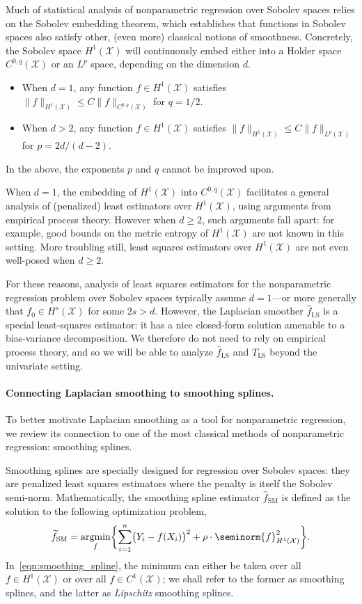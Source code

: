 \documentclass{article}
\newcommand{\1}{\mathbf{1}}
\DeclareMathOperator*{\argmin}{argmin}
\newcommand{\Xset}{\mathcal{X}}
\newcommand{\Leb}{L}
\newcommand{\wt}[1]{\widetilde{#1}}
\newcommand{\wh}[1]{\widehat{#1}}
\newcommand{\LS}{\mathrm{LS}}
\newcommand{\SM}{\mathrm{SM}}
\theoremstyle{alden}
\theoremstyle{aldenthm}
\theoremstyle{definition}
\theoremstyle{remark}
\begin{document}
Much of statistical analysis of nonparametric regression over Sobolev spaces relies on the Sobolev embedding theorem, which establishes that functions in Sobolev spaces also satisfy other, (even more) classical notions of smoothness. Concretely, the Sobolev space $H^1(\Xset)$ will continuously embed either into a Holder space $C^{0,q}(\Xset)$ or an $\Leb^p$ space, depending on the dimension $d$.
\begin{itemize}
	\item When $d = 1$, any function $f \in H^1(\Xset)$ satisfies $\|f\|_{H^1(\Xset)} \leq C\|f\|_{C^{0,q}(\Xset)}$ for $q = 1/2.$
	\item When $d > 2$, any function $f \in H^1(\Xset)$ satisfies $\|f\|_{H^1(\Xset)} \leq C\|f\|_{\Leb^{p}(\Xset)}$ for $p = 2d/(d - 2)$. 
\end{itemize}
In the above, the exponents $p$ and $q$ cannot be improved upon. 

When $d = 1$, the embedding of $H^1(\Xset)$ into $C^{0,q}(\Xset)$ facilitates a general analysis of (penalized) least estimators over $H^1(\Xset)$, using arguments from empirical process theory. However when $d \geq 2$, such arguments fall apart: for example, good bounds on the metric entropy of $H^1(\Xset)$ are not known in this setting. More troubling still, least squares estimators over $H^1(\Xset)$ are not even well-posed when $d \geq 2$.

For these reasons, analysis of least squares estimators for the nonparametric regression problem over Sobolev spaces typically assume $d = 1$---or more generally that $f_0 \in H^s(\Xset)$ for some $2s > d$. However, the Laplacian smoother $\wh{f}_{\LS}$ is a special least-squares estimator: it has a nice closed-form solution amenable to a bias-variance decomposition. We therefore do not need to rely on empirical process theory, and so we will be able to analyze $\wh{f}_{\LS}$ and $T_{\LS}$ beyond the univariate setting.

\paragraph{Connecting Laplacian smoothing to smoothing splines.} 
To better motivate Laplacian smoothing as a tool for nonparametric regression, we review its connection to one of the most classical methods of nonparametric regression: smoothing splines.

Smoothing splines are specially designed for regression over Sobolev spaces: they are penalized least squares estimators where the penalty is itself the Sobolev semi-norm. Mathematically, the smoothing spline estimator $\wh{f}_{\SM}$ is defined as the solution to the following optimization problem,
\begin{equation}
\label{eqn:smoothing_spline}
\wt{f}_{\SM} = \argmin_{f} \biggl\{\sum_{i = 1}^{n} \bigl(Y_i - f(X_i)\bigr)^2 + \rho \cdot \seminorm{f}_{H^{1}(\Xset)}^2\biggr\}.
\end{equation}
In~\eqref{eqn:smoothing_spline}, the minimum can either be taken over all $f \in H^1(\Xset)$ or over all $f \in C^1(\Xset)$; we shall refer to the former as smoothing splines, and the latter as \emph{Lipschitz} smoothing splines.
\end{document}
